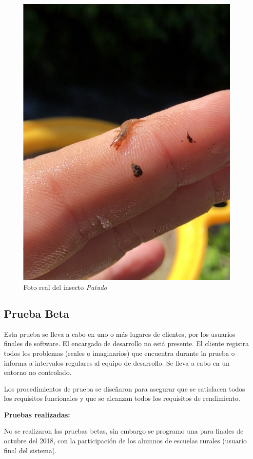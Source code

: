 		\begin{figure}[H]
			\centering
				\includegraphics[width=1\textwidth]{imagenes/testAlpha/6.JPG}
					\caption{Foto real del insecto \textit{Patudo}}
		\end{figure}
		
	\subsection{Prueba Beta}

		Esta prueba se lleva a cabo en uno o más lugares de clientes, por los usuarios finales de software. El encargado de desarrollo no está presente. El cliente registra todos los problemas (reales o imaginarios) que  encuentra durante la prueba o informa a intervalos regulares al equipo de desarrollo. Se lleva a cabo en un entorno no controlado.

		Los procedimientos de prueba se diseñaron para asegurar que se satisfacen todos los requisitos funcionales y que se alcanzan todos los requisitos de rendimiento.
		\newline

		\textbf{Pruebas realizadas:}
		
		No se realizaron las pruebas betas, sin embargo se programo una para finales de octubre del 2018, con la participación de los alumnos de escuelas rurales (usuario final del sistema).
